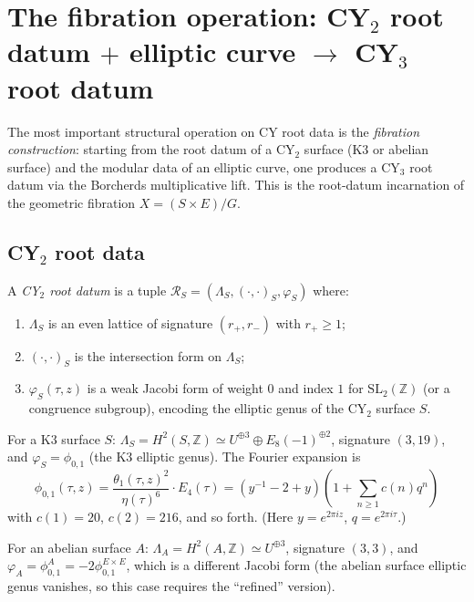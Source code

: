 \section{The fibration operation: CY$_2$ root datum $+$ elliptic curve $\to$ CY$_3$ root datum}
\label{sec:fibration}

The most important structural operation on CY root data is the \emph{fibration construction}: starting from the root datum of a CY$_2$ surface (K3 or abelian surface) and the modular data of an elliptic curve, one produces a CY$_3$ root datum via the Borcherds multiplicative lift. This is the root-datum incarnation of the geometric fibration $X = (S \times E)/G$.

\subsection{CY$_2$ root data}
\label{ssec:cy2-root-data}

\begin{definition}
\label{def:cy2-root-datum}
A \emph{CY$_2$ root datum} is a tuple $\mathcal{R}_S = (\Lambda_S, (\cdot,\cdot)_S, \varphi_S)$ where:
\begin{enumerate}[label=(\roman*)]
 \item $\Lambda_S$ is an even lattice of signature $(r_+, r_-)$ with $r_+ \geq 1$;
 \item $(\cdot, \cdot)_S$ is the intersection form on $\Lambda_S$;
 \item $\varphi_S(\tau, z)$ is a weak Jacobi form of weight $0$ and index $1$ for $\mathrm{SL}_2(\mathbb{Z})$ (or a congruence subgroup), encoding the elliptic genus of the CY$_2$ surface $S$.
\end{enumerate}
\end{definition}

\begin{example}
\label{ex:k3-root-datum}
For a K3 surface $S$: $\Lambda_S = H^2(S, \mathbb{Z}) \simeq U^{\oplus 3} \oplus E_8(-1)^{\oplus 2}$, signature $(3, 19)$, and $\varphi_S = \phi_{0,1}$ (the K3 elliptic genus). The Fourier expansion is
\[
 \phi_{0,1}(\tau, z) = \frac{\theta_1(\tau, z)^2}{\eta(\tau)^6} \cdot E_4(\tau) = (y^{-1} - 2 + y)(1 + \sum_{n \geq 1} c(n) q^n)
\]
with $c(1) = 20$, $c(2) = 216$, and so forth. (Here $y = e^{2\pi i z}$, $q = e^{2\pi i \tau}$.)
\end{example}

\begin{example}
\label{ex:abelian-root-datum}
For an abelian surface $A$: $\Lambda_A = H^2(A, \mathbb{Z}) \simeq U^{\oplus 3}$, signature $(3, 3)$, and $\varphi_A = \phi_{0,1}^A = -2\phi_{0,1}^{E \times E}$, which is a different Jacobi form (the abelian surface elliptic genus vanishes, so this case requires the ``refined'' version).
\end{example}


